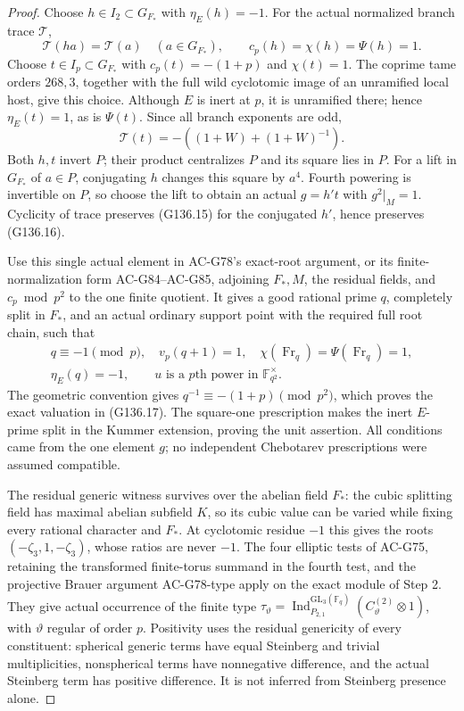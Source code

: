 \begin{proof}
Choose \(h\in I_2\subset G_{F_*}\) with \(\eta_E(h)=-1\).
For the actual normalized branch trace \(\mathcal T\),
\[
 \mathcal T(ha)=\mathcal T(a)\quad(a\in G_{F_*}),\qquad
 c_p(h)=\chi(h)=\Psi(h)=1.
 \tag{G136.15}
\]
Choose \(t\in I_p\subset G_{F_*}\) with
\(c_p(t)=-(1+p)\) and \(\chi(t)=1\).
The coprime tame orders \(268,3\), together with the full wild
cyclotomic image of an unramified local host, give this choice.
Although \(E\) is inert at \(p\), it is unramified there;
hence \(\eta_E(t)=1\), as is \(\Psi(t)\).
Since all branch exponents are odd,
\[
             \mathcal T(t)=-((1+W)+(1+W)^{-1}).
 \tag{G136.16}
\]
Both \(h,t\) invert \(P\); their product centralizes \(P\)
and its square lies in \(P\).
For a lift in \(G_{F_*}\) of \(a\in P\), conjugating \(h\)
changes this square by \(a^4\).  Fourth powering is invertible
on \(P\), so choose the lift to obtain an actual \(g=h't\)
with \(g^2|_M=1\).  Cyclicity of trace preserves (G136.15)
for the conjugated \(h'\), hence preserves (G136.16).

Use this single actual element in AC-G78's exact-root argument,
or its finite-normalization form AC-G84--AC-G85, adjoining
\(F_*,M\), the residual fields, and \(c_p\bmod p^2\) to the
one finite quotient.  It gives a good rational prime \(q\),
completely split in \(F_*\), and an actual ordinary support
point with the required full root chain, such that
\[
 \begin{gathered}
 q\equiv-1\pmod p,\quad v_p(q+1)=1,\quad
 \chi(\operatorname{Fr}_q)=\Psi(\operatorname{Fr}_q)=1,\\
 \eta_E(q)=-1,\qquad
 u\text{ is a }p\text{th power in }\mathbb F_{q^2}^{\times}.
 \end{gathered}
 \tag{G136.17}
\]
The geometric convention gives
\(q^{-1}\equiv-(1+p)\pmod{p^2}\), which proves the exact
valuation in (G136.17).
The square-one prescription makes the inert \(E\)-prime split
in the Kummer extension, proving the unit assertion.
All conditions came from the one element \(g\); no independent
Chebotarev prescriptions were assumed compatible.

The residual generic witness survives over the abelian field
\(F_*\): the cubic splitting field has maximal abelian subfield
\(K\), so its cubic value can be varied while fixing every
rational character and \(F_*\).
At cyclotomic residue \(-1\) this gives the roots
\((-\zeta_3,1,-\zeta_3)\), whose ratios are never \(-1\).
The four elliptic tests of AC-G75, retaining the transformed
finite-torus summand in the fourth test, and the projective
Brauer argument AC-G78-type apply on the exact module of Step 2.
They give actual occurrence of the finite type
\(\tau_\vartheta=\operatorname{Ind}_{P_{2,1}}^{\mathrm{GL}_3(\mathbb F_q)}
(C_\vartheta^{(2)}\otimes1)\), with \(\vartheta\) regular of
order \(p\).  Positivity uses the residual genericity of every
constituent: spherical generic terms have equal Steinberg and
trivial multiplicities, nonspherical terms have nonnegative
difference, and the actual Steinberg term has positive difference.
It is not inferred from Steinberg presence alone.


\end{proof}
